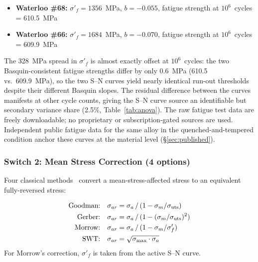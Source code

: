 \documentclass[twocolumn,12pt,a4paper]{article}
\begin{document}
\begin{itemize}
  \item \textbf{Waterloo \#68:} $\sigma'_f = 1356$~MPa, $b=-0.055$,
        fatigue strength at $10^6$~cycles = 610.5~MPa
  \item \textbf{Waterloo \#66:} $\sigma'_f = 1684$~MPa, $b=-0.070$,
        fatigue strength at $10^6$~cycles = 609.9~MPa
\end{itemize}

The 328~MPa spread in $\sigma'_f$ is almost exactly offset at
$10^6$~cycles: the two Basquin-consistent fatigue strengths differ by
only 0.6~MPa (610.5 vs.\ 609.9~MPa), so the two S--N curves yield
nearly identical run-out thresholds despite their different Basquin
slopes. The residual difference between the curves manifests at other
cycle counts, giving the S--N curve source an identifiable but
secondary variance share (2.5\%, Table~\ref{tab:anova}).
The raw fatigue test data are freely downloadable; no proprietary or
subscription-gated sources are used. Independent public fatigue data
for the same alloy in the quenched-and-tempered condition anchor these
curves at the material level (\S\ref{sec:published}).

\subsubsection{Switch 2: Mean Stress Correction (4 options)}

Four classical methods~\cite{stephens2001} convert a mean-stress-affected stress to an
equivalent fully-reversed stress:

\begin{subequations}\label{eq:mean_stress}
\begin{align}
\text{Goodman:}\quad
  \sigma_{ar} &= \sigma_a \,/\, (1 - \sigma_m/\sigma_{\rm uts})
  \label{eq:goodman} \\
\text{Gerber:}\quad
  \sigma_{ar} &= \sigma_a \,/\, (1 - (\sigma_m/\sigma_{\rm uts})^2)
  \label{eq:gerber} \\
\text{Morrow:}\quad
  \sigma_{ar} &= \sigma_a \,/\, (1 - \sigma_m/\sigma'_f)
  \label{eq:morrow} \\
\text{SWT:}\quad
  \sigma_{ar} &= \sqrt{\sigma_{\max} \cdot \sigma_a}
  \label{eq:swt}
\end{align}
\end{subequations}
For Morrow's correction, $\sigma'_f$ is taken from the active S--N
curve.
\end{document}
